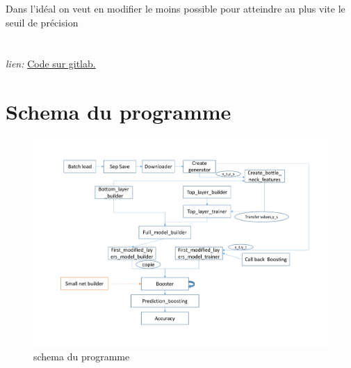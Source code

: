 \documentclass[11 pt]{article}
\begin{document}
\paragraph{}Dans l’idéal on veut en modifier le moins possible pour atteindre au plus vite le seuil de précision

\begin{appendices}
  \chapter{}
    \paragraph{}\emph{lien: }\href{https://gitlab.com/zlanderous/transboost}{Code sur gitlab.}
    \newpage


  \chapter{Schema du programme}
  \begin{figure}[h]
    \includegraphics[width=\textwidth]{figTot.pdf}
    \caption{schema du programme}
    \label{figTot}
  \end{figure}

\end{appendices}
\end{document}
